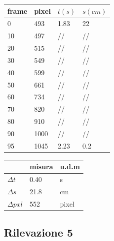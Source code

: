\begin{tabular}{ | m{3em} | m{3em} | m{2.5em}| m{2.5em} | } 
 \hline
 \vspace{5pt} frame \vspace{5pt}  &  pixel & $t(s)$ & $s(cm)$\\ 
 \hline
 \hline
 0 & 493 & 1.83  & 22\\ 
 \hline
 10 & 497 & //  & //\\
 \hline
 20 & 515 & //  & //\\ 
 \hline
 30 & 549 & //  & //\\ 
 \hline
 40 & 599 & //  & //\\ 
 \hline
 50 & 661 & //  & //\\ 
 \hline
 60 & 734 & //  & //\\ 
 \hline
 70 & 820 & //  & //\\ 
 \hline
 80 & 910 & //  & //\\ 
 \hline
 90 & 1000 & //  & //\\ 
 \hline
 95 & 1045 & 2.23  & 0.2\\ 
 \hline
\end{tabular}
\quad
\begin{tabular}{ | m{3em} | m{3em} | m{1cm}| } 
 \hline
   &  misura & u.d.m \\ 
 \hline
 \hline
 $\Delta t$   &  0.40 	& s\\
 \hline
 $\Delta s$   &  21.8	& cm\\
 \hline
 $\Delta pxl$ & 552	& pixel\\
 \hline
\end{tabular}



\newpage
\subsection{Rilevazione 5}

